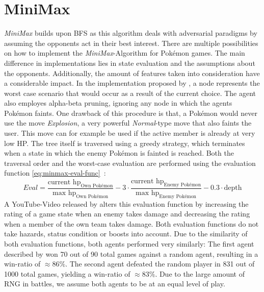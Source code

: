 \section{MiniMax}
\label{sec:related-minimax}
\textit{MiniMax} builds upon \ac{BFS} as this algorithm deals with adversarial paradigms by assuming the opponents 
act in their best interest.
There are multiple possibilities on how to implement the \textit{MiniMax}-Algorithm for Pokémon games. The main difference 
in implementations lies in state evaluation and the assumptions about the opponents. Additionally,
the amount of features taken into consideration have a considerable impact. In the implementation proposed by
\cite{Lee_Togelius_2017}, a node represents the worst case scenario that would occur as a result of the current choice. 
The agent also employes alpha-beta pruning, ignoring any node in which the agents Pokémon faints. 
One drawback of this procedure is that, a Pokémon would never use the move \textit{Explosion},
a very powerful \textit{Normal}-type move that also faints the user. This move can for example be used if
the active member is already at very low \ac{HP}.
The tree itself is traversed using a greedy strategy, which terminates when a state in which the enemy 
Pokémon is fainted is reached. Both the traversal order and the worst-case evaluation are performed using
the evaluation function \ref{eq:minmax-eval-func}~\autocite{Lee_Togelius_2017}:
\begin{equation}
\label{eq:minmax-eval-func}
    Eval = \frac{\text{current hp}_{\text{Own Pokémon}}}{\text{max hp}_{\text{Own Pokémon}}} -
    3 \cdot \frac{\text{current hp}_{\text{Enemy Pokémon}}}{\text{max hp}_{\text{Enemy Pokémon}}} -
    0.3 \cdot \text{depth}
\end{equation}
A YouTube-Video released by \cite{RemptonGames:PokemonAI}
alters this evaluation function
by increasing the rating of a game state when an enemy takes damage and decreasing the rating when a member
of the own team takes damage. Both evaluation functions do not take hazards, status condition or boosts 
into account. Due to the similarity of both evaluation functions, both agents performed very similarly:
The first agent described by \cite{Lee_Togelius_2017} won 70 out of 90 total games against a random agent,
resulting in a win-ratio of $\approx 86\%$. The second agent defeated the random player in 831 out of 1000
total games, yielding a win-ratio of $\approx 83\%$. Due to the large amount of \ac{RNG} in battles, we assume
both agents to be at an equal level of play. \\
